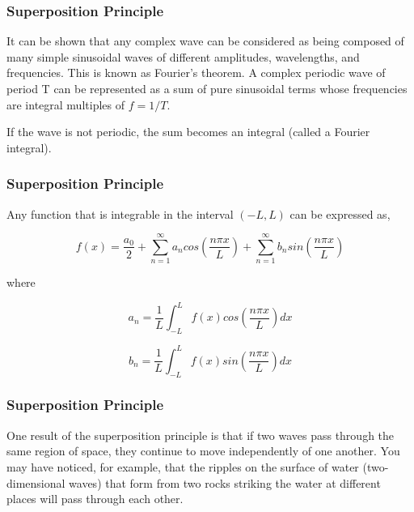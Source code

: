 \documentclass[]{beamer}
\begin{document}


\begin{frame}
\frametitle{Superposition Principle}


It can be shown that any complex wave can be considered as being composed of
many simple sinusoidal waves of different amplitudes, wavelengths, and frequencies.
This is known as Fourier’s theorem. A complex periodic wave of period T can be
represented as a sum of pure sinusoidal terms whose frequencies are integral
multiples of $f = 1/T$.



\vspace{3mm}
If the wave is not periodic, the sum becomes an integral
(called a Fourier integral).


  \end{frame}



\begin{frame}
\frametitle{Superposition Principle}

Any function that is integrable in the interval $(-L,L)$ can be expressed as,

\begin{equation}
f(x)=\frac{a_0}{2}+\sum^{\infty}_{n=1} a_n cos\left(\frac{n\pi x}{L}\right)+\sum^{\infty}_{n=1} b_n sin\left(\frac{n\pi x}{L}\right)
\end{equation}


where 

\begin{equation}
a_n=\frac{1}{L}\int^{L}_{-L}f(x)cos\left(\frac{n\pi x}{L}\right)dx
\end{equation}

\begin{equation}
b_n=\frac{1}{L}\int^{L}_{-L}f(x)sin\left(\frac{n\pi x}{L}\right)dx
\end{equation}

  \end{frame}


\begin{frame}
\frametitle{Superposition Principle}



One result of the superposition principle is that if two waves pass through
the same region of space, they continue to move independently of one another.
You may have noticed, for example, that the ripples on the surface of water
(two-dimensional waves) that form from two rocks striking the water at different
places will pass through each other.

  \end{frame}
\end{document}
